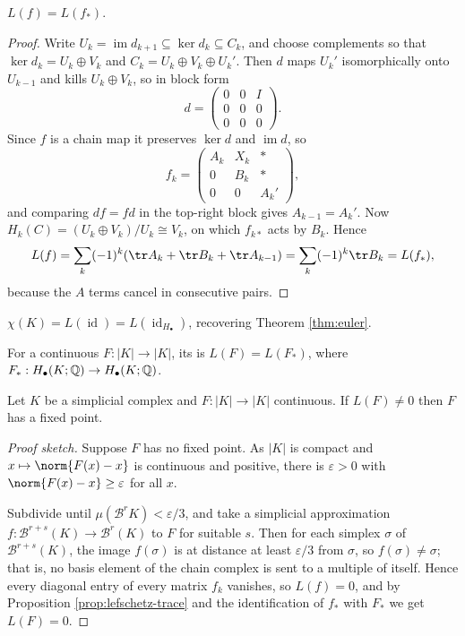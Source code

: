 \documentclass[a4paper]{scrartcl}
\newcommand{\id}{\operatorname{id}}
\newcommand{\bary}{\mathcal{B}}
\begin{document}
\begin{proposition} \label{prop:lefschetz-trace}
	$L(f) = L(f_*)$.
\end{proposition}
\begin{proof}
	Write $U_k = \operatorname{im}d_{k+1}\subseteq \ker d_k\subseteq C_k$, and choose complements so that $\ker d_k = U_k\oplus V_k$ and $C_k = U_k\oplus V_k\oplus U_k'$. Then $d$ maps $U_k'$ isomorphically onto $U_{k-1}$ and kills $U_k\oplus V_k$, so in block form
	$$
	d = \begin{pmatrix}0&0&I\\0&0&0\\0&0&0\end{pmatrix}.
	$$
	Since $f$ is a chain map it preserves $\ker d$ and $\operatorname{im}d$, so
	$$
	f_k = \begin{pmatrix}A_k & X_k & *\\ 0 & B_k & *\\ 0&0&A_k'\end{pmatrix},
	$$
	and comparing $df = fd$ in the top-right block gives $A_{k-1} = A_k'$. Now $H_k(C) = (U_k\oplus V_k)/U_k \cong V_k$, on which $f_{k*}$ acts by $B_k$. Hence
	$$
	L(f) = \sum_k(-1)^k(\tr A_k + \tr B_k + \tr A_{k-1}) = \sum_k(-1)^k\tr B_k = L(f_*),
	$$
	because the $A$ terms cancel in consecutive pairs.
\end{proof}

\begin{corollary}
	$\chi(K) = L(\id) = L(\id_{H_\bullet})$, recovering Theorem \ref{thm:euler}.
\end{corollary}

\begin{definition}
	For a continuous $F: |K|\to|K|$, its  is $L(F) = L(F_*)$, where $F_*: H_\bullet(K;\mathbb{Q})\to H_\bullet(K;\mathbb{Q})$.
\end{definition}

\begin{theorem} \label{thm:lefschetz}
	Let $K$ be a simplicial complex and $F: |K|\to|K|$ continuous. If $L(F)\neq 0$ then $F$ has a fixed point.
\end{theorem}
\begin{proof}[Proof sketch]
	Suppose $F$ has no fixed point. As $|K|$ is compact and $x \mapsto \norm{F(x)-x}$ is continuous and positive, there is $\varepsilon>0$ with $\norm{F(x)-x}\geq\varepsilon$ for all $x$.

	Subdivide until $\mu(\bary^r K) < \varepsilon/3$, and take a simplicial approximation $f: \bary^{r+s}(K)\to\bary^r(K)$ to $F$ for suitable $s$. Then for each simplex $\sigma$ of $\bary^{r+s}(K)$, the image $f(\sigma)$ is at distance at least $\varepsilon/3$ from $\sigma$, so $f(\sigma)\neq\sigma$; that is, no basis element of the chain complex is sent to a multiple of itself. Hence every diagonal entry of every matrix $f_k$ vanishes, so $L(f) = 0$, and by Proposition \ref{prop:lefschetz-trace} and the identification of $f_*$ with $F_*$ we get $L(F) = 0$.
\end{proof}
\end{document}
